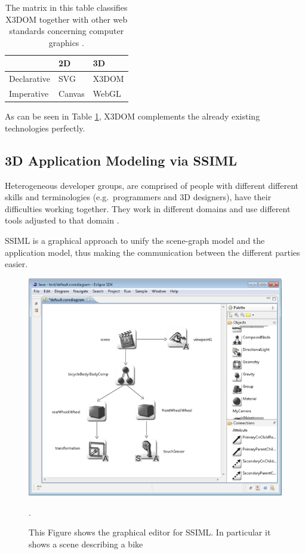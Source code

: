 \begin{longtable}[c]{@{}lll@{}}
  \caption{The matrix in this table classifies X3DOM together with other web standards concerning computer graphics \cite{x3dom}.\label{tab:feature_matrix}}\\
  \toprule
  & 2D & \gls{3D} \tabularnewline
  \midrule
  \endhead
  Declarative & \gls{SVG} \cite{svg} & X3DOM \cite{x3dom} \tabularnewline
  Imperative  & Canvas \cite{canvas} & \gls{WebGL} \cite{webgl} \tabularnewline
  \bottomrule
\end{longtable}

As can be seen in Table \ref{tab:feature_matrix}, X3DOM complements the already existing technologies
perfectly.

\clearpage
\subsection{3D Application Modeling via SSIML}
\label{ssiml}

Heterogeneous developer groups, are comprised of people with
different different skills and terminologies (e.g.~programmers and \gls{3D} designers), have their difficulties
working together. They work in different domains and use different tools
adjusted to that domain \cite{Glinz:2015:SUS:2802768.2802838}.

SSIML is a graphical approach to unify the scene-graph model and the
application model, thus making the communication between the different
parties easier.


\begin{figure}
  \centering
  \includegraphics[width=\textwidth]{../assets/SSIML.png}
  \caption{This Figure shows the graphical editor for SSIML. In particular it shows a scene describing a bike \cite{roundtrip3dwebsite}}.
  \label{fig:ssimldiagram}
\end{figure}

